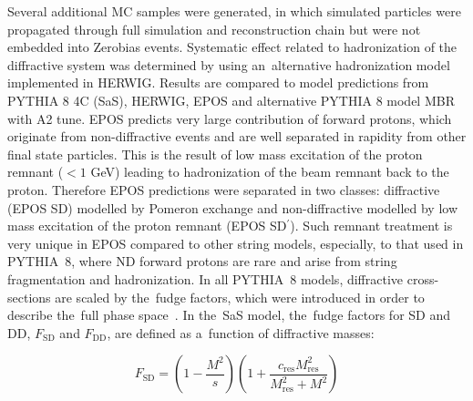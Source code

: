 
Several additional MC samples were generated, in which  simulated particles were propagated through full simulation and reconstruction chain but were  not embedded  into Zerobias events.   
Systematic effect related to hadronization of the diffractive system was determined by using an~alternative hadronization model implemented in HERWIG. Results are compared to model predictions from PYTHIA 8 4C (\ac{SaS}), HERWIG, EPOS and alternative PYTHIA 8 model  \ac{MBR}  with A2 tune. EPOS predicts very large contribution of forward 
protons, which originate from non-diffractive events and are well separated in rapidity from other final state particles. This is the result of low mass excitation of the proton remnant ($<1$ GeV) leading to hadronization of the beam remnant back to the proton. Therefore EPOS predictions were separated in two classes: diffractive (EPOS SD) modelled by Pomeron exchange and non-diffractive modelled  by low mass excitation of the proton remnant (EPOS SD$^\prime$). Such remnant treatment is very unique in EPOS compared to other string models, especially, to that used in PYTHIA~8, where \ac{ND} forward protons are rare 
and  arise from string fragmentation and hadronization. In all PYTHIA~8 models, diffractive cross-sections are scaled by the~fudge factors, which were introduced in order to describe the~full phase space~\cite{Sjostrand:2006za,MBR:intro}. In the~\ac{SaS} model, the~fudge factors for SD and DD,  $F_{\textrm{SD}}$ and $F_{\textrm{DD}}$, are defined as a~function of diffractive masses:

\begin{equation}
F_{\textrm{SD}}=\left(1-\frac{M^2}{s}\right)\left(1+\frac{c_\textrm{res}M^2_\textrm{res}}{M^2_\textrm{res}+M^2}\right)
\end{equation}

